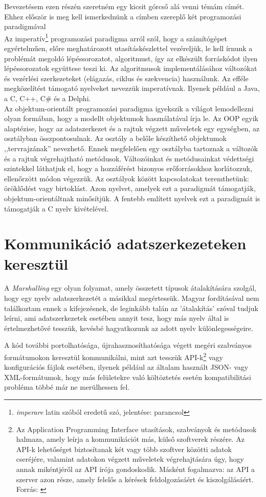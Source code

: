 \documentclass[tocnopagenum]{thesis-ekf}
\theoremstyle{definition}
\theoremstyle{remark}
\begin{document}
	Bevezetésem ezen részén szeretném egy kicsit górcső alá venni témám címét. Ehhez először is meg kell ismerkednünk a címben szereplő két programozási paradigmával\\
	Az imperatív\footnote{\textit{imperare} latin szóból eredetű szó, jelentése: parancsol} programozási paradigma arról szól, hogy a számítógépet egyértelműen, előre meghatározott utasításkészlettel vezéreljük, le kell írnunk a problémát megoldó lépéssorozatot, algoritmust, így az elkészült forráskódot ilyen lépéssorozatok együttese teszi ki. Az algoritmusok implementálásához változókat és vezérlési szerkezeteket (elágazás, ciklus és szekvencia) használunk. Az efféle megközelítést támogató nyelveket nevezzük imperatívnak. Ilyenek például a Java, a C, C++, C\# és a Delphi.
	\\
	Az objektum-orientált programozási paradigma igyekszik a világot lemodellezni olyan formában, hogy a modellt objektumok használatával írja le. Az OOP egyik alaptézise, hogy az adatszerkezet és a rajtuk végzett műveletek egy egységben, az osztályban összpontosulnak. Az osztály a belőle készíthető objektumok ,,tervrajzának'' nevezhető. Ennek megfelelően egy osztályba tartoznak a változók és a rajtuk végrehajtható metódusok. Változóinkat és metódusainkat védettségi szintekkel láthatjuk el, hogy a hozzáférést bizonyos erőforrásokhoz korlátozzuk, ellenőrzött módon végezzük. Az osztályok között kapcsolatokat teremthetünk: öröklődést vagy birtoklást. Azon nyelvet, amelyek ezt a paradigmát támogatják, objektum-orientáltnak minősítjük.
	A fentebb említett nyelvek ezt a paradigmát is támogatják a C nyelv kivételével.
	
	\section{Kommunikáció adatszerkezeteken keresztül}
	A \emph{Marshalling} egy olyan folyamat, amely összetett típusok átalakítására szolgál, hogy egy nyelv adatszerkezetét a másikkal megértessük. Magyar fordításával nem találkoztam ennek a kifejezésnek, de leginkább talán az 'átalakítás' szóval tudjuk leírni, ami adatszerkezetek esetében annyit tesz, hogy más nyelv által is értelmezhetővé tesszük, kevésbé hagyatkozunk az adott nyelv különlegességeire.\cite{sof_marshalling}
	\par
	A kód további portolhatósága, újrahasznosíthatósága végett megéri szabványos formátumokon keresztül kommunikálni, mint azt tesszük API-k\footnote{Az Application Programming Interface utasítások, szabványok és metódusok halmaza, amely leírja a kommunikációt más, külső szoftverek részére. Az API-k lehetőséget biztosítanak két vagy több szoftver közötti adatok cseréjére, valamint adatokon végzett műveletek végrehajtására úgy, hogy annak mikéntjéről az API írója gondoskodik. Másként fogalmazva: az API a szerver azon része, amely felelős a kérések feldolgozásáért és kiszolgálásáért. Forrás: \cite{api}} vagy konfigurációs fájlok esetében, ilyenek például az általam használt JSON- vagy XML-formátumok,  hogy más felületekre való költöztetés esetén kompatibilitási probléma többé már ne merülhessen fel.
	
\end{document}
